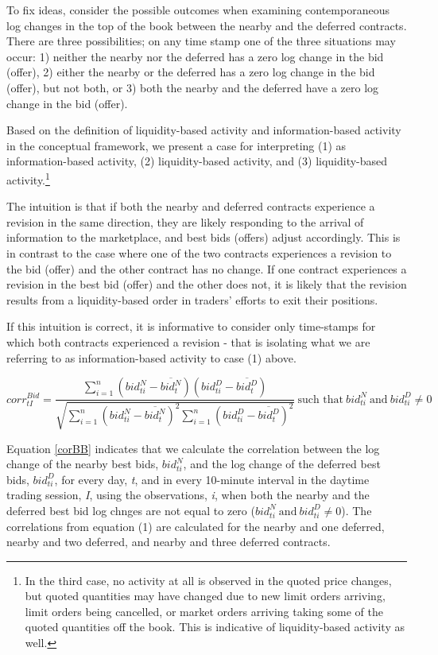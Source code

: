 \documentclass[]{elsarticle} %
\begin{document}
To fix ideas, consider the possible outcomes when examining
contemporaneous log changes in the top of the book between the nearby
and the deferred contracts. There are three possibilities; on any time
stamp one of the three situations may occur: 1) neither the nearby nor
the deferred has a zero log change in the bid (offer), 2) either the
nearby or the deferred has a zero log change in the bid (offer), but not
both, or 3) both the nearby and the deferred have a zero log change in
the bid (offer).

Based on the definition of liquidity-based activity and
information-based activity in the conceptual framework, we present a
case for interpreting (1) as information-based activity, (2)
liquidity-based activity, and (3) liquidity-based activity.\footnote{In
  the third case, no activity at all is observed in the quoted price
  changes, but quoted quantities may have changed due to new limit
  orders arriving, limit orders being cancelled, or market orders
  arriving taking some of the quoted quantities off the book. This is
  indicative of liquidity-based activity as well.}

The intuition is that if both the nearby and deferred contracts
experience a revision in the same direction, they are likely responding
to the arrival of information to the marketplace, and best bids (offers)
adjust accordingly. This is in contrast to the case where one of the two
contracts experiences a revision to the bid (offer) and the other
contract has no change. If one contract experiences a revision in the
best bid (offer) and the other does not, it is likely that the revision
results from a liquidity-based order in traders' efforts to exit their
positions.

If this intuition is correct, it is informative to consider only
time-stamps for which both contracts experienced a revision - that is
isolating what we are referring to as information-based activity to case
(1) above.

\begin{equation} \label{corBB} 
corr^{Bid}_{tI} = \frac{\sum\limits_{i=1}^{n} \left(bid_{ti}^N - \overline{bid_t^N}\right) \left(bid_{ti}^D - \overline{bid_t^D}\right)}{\sqrt{\sum\limits_{i=1}^{n} \left(bid_{ti}^N - \overline{bid_t^N}\right)^2 \sum\limits_{i=1}^{n}\left(bid_{ti}^D - \overline{bid_t^D}\right)^2}} \: \textrm{such that} \: bid_{ti}^N \: \textrm{and} \: bid_{ti}^D \neq 0
\end{equation}

Equation \ref{corBB} indicates that we calculate the correlation between
the log change of the nearby best bids, \(bid_{ti}^N\), and the log
change of the deferred best bids, \(bid_{ti}^D\), for every day,
\emph{t}, and in every 10-minute interval in the daytime trading
session, \emph{I}, using the observations, \emph{i}, when both the
nearby and the deferred best bid log chnges are not equal to zero
(\(bid_{ti}^N \: \textrm{and} \: bid_{ti}^D \neq 0\)). The correlations
from equation (1) are calculated for the nearby and one deferred, nearby
and two deferred, and nearby and three deferred contracts.
\end{document}
